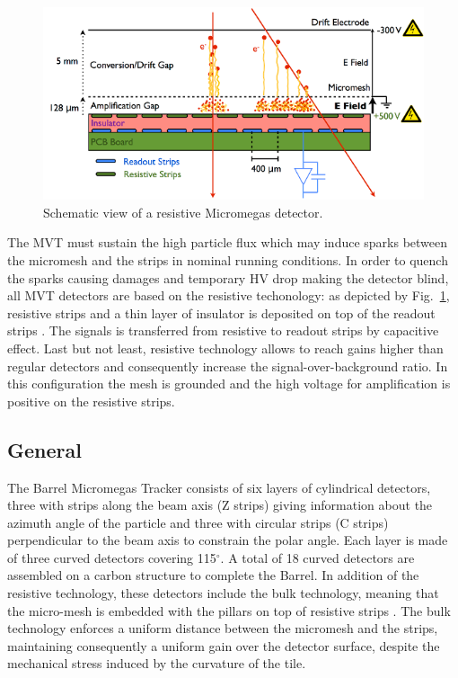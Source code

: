 \begin{figure}[htb]
 \includegraphics[width=1.0\columnwidth,keepaspectratio]{images/mm_principle}
 \caption{Schematic view of a resistive Micromegas detector.}
 \label{fig:mm-principle}
\end{figure}

The MVT must sustain the high particle flux which may induce sparks between the micromesh and the strips in nominal running conditions. In order to quench the sparks causing damages and temporary HV drop making the detector blind, all MVT detectors are based on the resistive techonology: as depicted by Fig.~\ref{fig:mm-principle}, resistive strips and a thin layer of insulator is deposited on top of the readout strips \cite{ALEXOPOULOS2011110}. The signals is transferred from resistive to readout strips by capacitive effect. Last but not least, resistive technology allows to reach gains higher than regular detectors and consequently increase the signal-over-background ratio. In this configuration the mesh is grounded and the high voltage for amplification is positive on the resistive strips. 

\subsection{General}

The Barrel Micromegas Tracker consists of six layers of cylindrical detectors, three with strips along the beam axis (Z strips) giving information about the azimuth angle of the particle and three with circular strips (C strips) perpendicular to the beam axis to constrain the polar angle. Each layer is made of three curved detectors covering 115$^{\circ}$. A total of 18 curved detectors are assembled on a carbon structure to complete the Barrel. In addition of the resistive technology, these detectors include the bulk technology, meaning that the micro-mesh is embedded with the pillars on top of resistive strips \cite{GIOMATARIS2006405}. The bulk technology enforces a uniform distance between the micromesh and the strips, maintaining consequently a uniform gain over the detector surface, despite the mechanical stress induced by the curvature of the tile.

